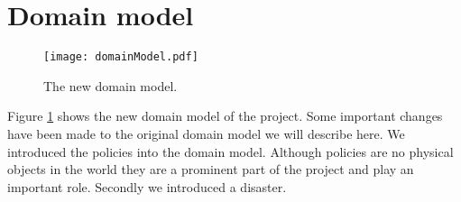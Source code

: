 \section{Domain model}
\begin{figure}[htb]
\centering
\texttt{[image: domainModel.pdf]}
\caption{The new domain model.}
\label{fig:newDomainModel}
\end{figure}
Figure \ref{fig:newDomainModel} shows the new domain model of the project. Some important changes have been made to the original domain model we will describe here. We introduced the policies into the domain model. Although policies are no physical objects in the world they are a prominent part of the project and play an important role. Secondly we introduced a disaster.